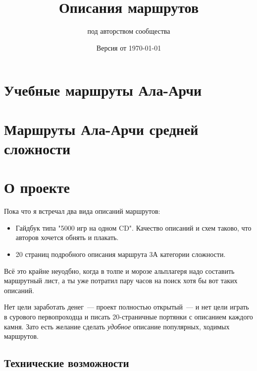 \documentclass[11pt,fleqn]{report} %
\title{Описания маршрутов}
\date{Версия от \today}
\author{под авторством сообщества}
\begin{document}
\maketitle

\tableofcontents

\chapter{Учебные маршруты Ала-Арчи}

\routeListEasyAlaArcha

\chapter{Маршруты Ала-Арчи средней сложности}

\routeListMiddleAlaArcha

\chapter{О проекте}

\newcommand{\gitRepo}[0]{\href{https://github.com/johnlepikhin/alpine-guidebook}{GitHub}}

Пока что я встречал два вида описаний маршрутов:
\begin{itemize}
\item Гайдбук типа "5000 игр на одном CD". Качество описаний и схем
  таково, что авторов хочется обнять и плакать.
\item 20 страниц подробного описания маршрута 3А категории сложности.
\end{itemize}

Всё это крайне неуодбно, когда в толпе и морозе альплагеря надо
составить маршрутный лист, а ты уже потратил пару часов на поиск хотя
бы вот таких описаний.

Нет цели заработать денег~--- проект полностью открытый~--- и нет цели
играть в сурового первопроходца и писать 20-страничные портянки с
описанием каждого камня. Зато есть желание сделать \textit{удобное}
описание популярных, ходимых маршрутов.

\section{Технические возможности}
\end{document}
